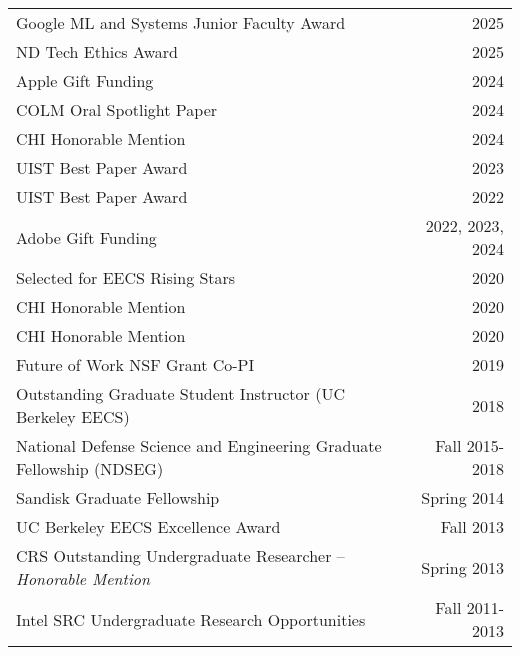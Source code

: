\begin{longtable}{Xr}
	Google ML and Systems Junior Faculty Award & 2025 \\
	ND Tech Ethics Award & 2025 \\
	Apple Gift Funding & 2024 \\
	COLM Oral Spotlight Paper & 2024 \\
	CHI Honorable Mention & 2024 \\
	UIST Best Paper Award & 2023 \\
	UIST Best Paper Award & 2022 \\
	Adobe Gift Funding & 2022, 2023, 2024 \\
	Selected for EECS Rising Stars & 2020 \\
	CHI Honorable Mention & 2020 \\
	CHI Honorable Mention & 2020 \\
	Future of Work NSF Grant Co-PI & 2019 \\
	Outstanding Graduate Student Instructor (UC Berkeley EECS) & 2018 \\
	National Defense Science and Engineering Graduate Fellowship (NDSEG) & Fall 2015-2018 \\
	Sandisk Graduate Fellowship & Spring 2014 \\
	UC Berkeley EECS Excellence Award & Fall 2013 \\
	CRS Outstanding Undergraduate Researcher -- \textit{Honorable Mention} & Spring 2013 \\
	Intel SRC Undergraduate Research Opportunities & Fall 2011-2013 \\
\end{longtable}
